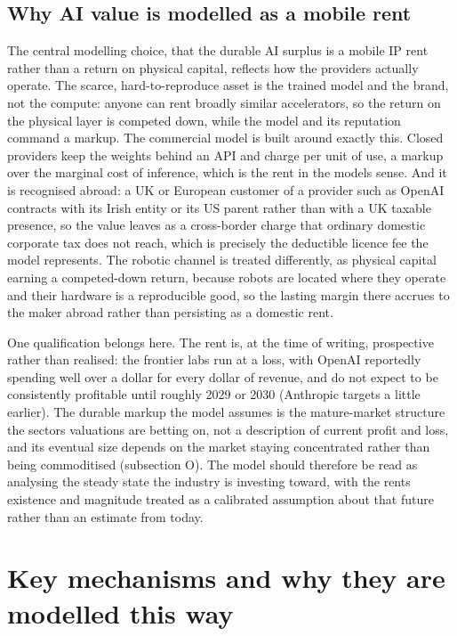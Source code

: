 \documentclass[12pt]{article}
\begin{document}
\hypertarget{why-ai-value-is-modelled-as-a-mobile-rent}{%
\subsection{Why AI value is modelled as a mobile
rent}\label{why-ai-value-is-modelled-as-a-mobile-rent}}

The central modelling choice, that the durable AI surplus is a mobile IP
rent rather than a return on physical capital, reflects how the
providers actually operate. The scarce, hard-to-reproduce asset is the
trained model and the brand, not the compute: anyone can rent broadly
similar accelerators, so the return on the physical layer is competed
down, while the model and its reputation command a markup. The
commercial model is built around exactly this. Closed providers keep the
weights behind an API and charge per unit of use, a markup over the
marginal cost of inference, which is the rent in the
model\textquotesingle s sense. And it is recognised abroad: a UK or
European customer of a provider such as OpenAI contracts with its Irish
entity or its US parent rather than with a UK taxable presence, so the
value leaves as a cross-border charge that ordinary domestic corporate
tax does not reach, which is precisely the deductible licence fee the
model represents. The robotic channel is treated differently, as
physical capital earning a competed-down return, because robots are
located where they operate and their hardware is a reproducible good, so
the lasting margin there accrues to the maker abroad rather than
persisting as a domestic rent.

One qualification belongs here. The rent is, at the time of writing,
prospective rather than realised: the frontier labs run at a loss, with
OpenAI reportedly spending well over a dollar for every dollar of
revenue, and do not expect to be consistently profitable until roughly
2029 or 2030 (Anthropic targets a little earlier). The durable markup
the model assumes is the mature-market structure the
sector\textquotesingle s valuations are betting on, not a description of
current profit and loss, and its eventual size depends on the market
staying concentrated rather than being commoditised (subsection O). The
model should therefore be read as analysing the steady state the
industry is investing toward, with the rent\textquotesingle s existence
and magnitude treated as a calibrated assumption about that future
rather than an estimate from today.

\hypertarget{upgrades}{}
\hypertarget{key-mechanisms-and-why-they-are-modelled-this-way}{%
\section{Key mechanisms and why they are modelled this
way}\label{key-mechanisms-and-why-they-are-modelled-this-way}}
\end{document}
